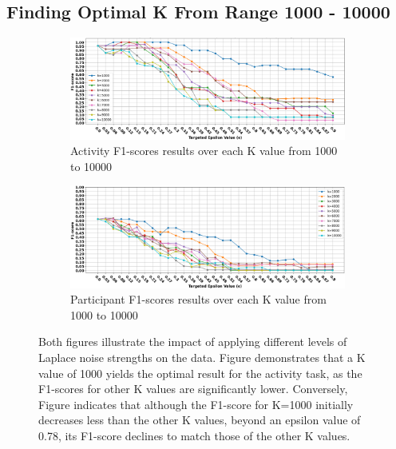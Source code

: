 \documentclass{l4proj}
\begin{document}
\begin{appendices}
\newpage

\subsection{Finding Optimal K From Range 1000 - 10000}
\begin{figure}[h]
    \centering
    \begin{subfigure}{1\textwidth}
        \includegraphics[width=\textwidth]{images/privacy-preservation-topk10000-evaluation-method2-activity-f1-scores.png}
        \caption{Activity F1-scores results over each K value from 1000 to 10000}
        \label{fig:privacy-preservation-topk10000-evaluation-method2-activity-f1-scores}
    \end{subfigure}
    \qquad
    \begin{subfigure}{1\textwidth}
        \includegraphics[width=\textwidth]{images/privacy-preservation-topk10000-evaluation-method2-participant-f1-scores.png}
        \caption{Participant F1-scores results over each K value from 1000 to 10000}
        \label{fig:privacy-preservation-topk10000-evaluation-method2-participant-f1-scores}
    \end{subfigure}
    \caption{Both figures illustrate the impact of applying different levels of Laplace noise strengths on the data. Figure  demonstrates that a K value of 1000 yields the optimal result for the activity task, as the F1-scores for other K values are significantly lower. Conversely, Figure  indicates that although the F1-score for K=1000 initially decreases less than the other K values, beyond an epsilon value of 0.78, its F1-score declines to match those of the other K values.}
    \label{fig:privacy-preservation-topk10000-evaluation}
\end{figure}


\end{appendices}
\end{document}
